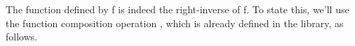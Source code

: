 \ccpad
The function defined by  \ab f  is indeed the right-inverse of \ab f. To state this, we'll use the function composition operation , which is already defined in the \typetopology library, as follows.
\ccpad
\begin{code}%
\>[1]\AgdaSpace{}%
\AgdaSymbol{:}\AgdaSpace{}%
\AgdaSymbol{\{}\AgdaSpace{}%
\AgdaSymbol{:}\AgdaSpace{}%
\AgdaSpace{}%
\AgdaSpace{}%
\AgdaSymbol{\}}\AgdaSpace{}%
\AgdaSymbol{\{}\AgdaSpace{}%
\AgdaSymbol{:}\AgdaSpace{}%
\AgdaSpace{}%
\AgdaSymbol{\}\{}\AgdaSpace{}%
\AgdaSymbol{:}\AgdaSpace{}%
\AgdaSpace{}%
\AgdaSpace{}%
\AgdaSpace{}%
\AgdaSpace{}%
\AgdaSymbol{\}}\AgdaSpace{}%
\AgdaSpace{}%
%
\AgdaSpace{}%
\AgdaSpace{}%
\AgdaSpace{}%
\AgdaSymbol{(}\AgdaSpace{}%
\AgdaSymbol{:}\AgdaSpace{}%
\AgdaSpace{}%
\AgdaSpace{}%
\AgdaSymbol{)}\AgdaSpace{}%
\AgdaSpace{}%
\AgdaSymbol{(}\AgdaSpace{}%
\AgdaSymbol{:}\AgdaSpace{}%
\AgdaSymbol{)}\AgdaSpace{}%
\AgdaSpace{}%
\AgdaSpace{}%
\AgdaSymbol{(}\AgdaSpace{}%
\AgdaSymbol{)}\<%
\\
%
\>[1]\AgdaSpace{}%
\AgdaSpace{}%
\AgdaSpace{}%
\AgdaSymbol{=}\AgdaSpace{}%
\AgdaSpace{}%
\AgdaSpace{}%
\AgdaSpace{}%
\AgdaSpace{}%
\AgdaSymbol{(}\AgdaSpace{}%
\AgdaSymbol{)}\<%
\end{code}
\scpad
